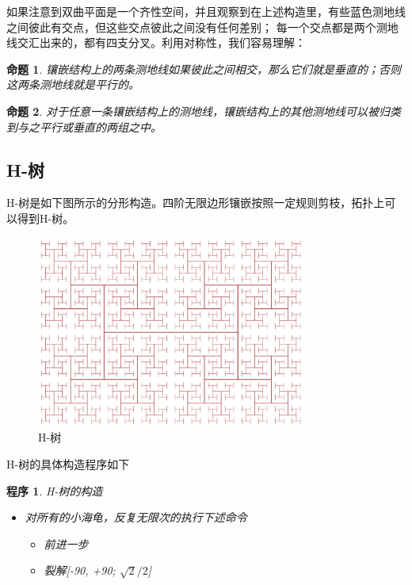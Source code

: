 \documentclass[a4paper,12pt]{article}
\newtheorem{proposition}{命题}
\newtheorem{program}{程序}
\begin{document}
如果注意到双曲平面是一个齐性空间，并且观察到在上述构造里，有些蓝色测地线之间彼此有交点，但这些交点彼此之间没有任何差别；
每一个交点都是两个测地线交汇出来的，都有四支分叉。利用对称性，我们容易理解：

\begin{proposition}
\label{A}
镶嵌结构上的两条测地线如果彼此之间相交，那么它们就是垂直的；否则这两条测地线就是平行的。
\end{proposition}

\begin{proposition}
\label{B}
对于任意一条镶嵌结构上的测地线，镶嵌结构上的其他测地线可以被归类到与之平行或垂直的两组之中。
\end{proposition}

\subsection{H-树}

H-树是如下图所示的分形构造。四阶无限边形镶嵌按照一定规则剪枝，拓扑上可以得到H-树。

\begin{figure}[ht]
\centering
\includegraphics[width=3.5in]{images/2000px-H_tree.png}
\caption{H-树}
\end{figure}

H-树的具体构造程序如下

\begin{program}
H-树的构造
\begin{itemize}
\item 对所有的小海龟，反复无限次的执行下述命令
\begin{itemize}\item 前进一步 \item 裂解[-90, +90; $\sqrt{2} / 2$] \end{itemize}
\end{itemize}
\end{program}
\end{document}
